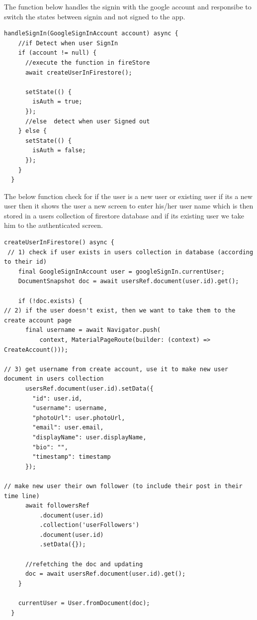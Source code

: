 The function below handles the signin with the google account and responsibe to switch the states between signin and not signed to the app.
\begin{verbatim}
handleSignIn(GoogleSignInAccount account) async {
    //if Detect when user SignIn
    if (account != null) {
      //execute the function in fireStore
      await createUserInFirestore();

      setState(() {
        isAuth = true;
      });
      //else  detect when user Signed out
    } else {
      setState(() {
        isAuth = false;
      });
    }
  }

\end{verbatim}

The below function check for if the user is a new user or existing user if its a new user then it shows the user a new screen to enter his/her user name which is then stored in a users collection of firestore database and if its existing user we take him to the authenticated screen.

\begin{verbatim}
createUserInFirestore() async {
 // 1) check if user exists in users collection in database (according to their id)
    final GoogleSignInAccount user = googleSignIn.currentUser;
    DocumentSnapshot doc = await usersRef.document(user.id).get();

    if (!doc.exists) {
// 2) if the user doesn't exist, then we want to take them to the create account page
      final username = await Navigator.push(
          context, MaterialPageRoute(builder: (context) => CreateAccount()));

// 3) get username from create account, use it to make new user document in users collection
      usersRef.document(user.id).setData({
        "id": user.id,
        "username": username,
        "photoUrl": user.photoUrl,
        "email": user.email,
        "displayName": user.displayName,
        "bio": "",
        "timestamp": timestamp
      });

// make new user their own follower (to include their post in their time line)
      await followersRef
          .document(user.id)
          .collection('userFollowers')
          .document(user.id)
          .setData({});

      //refetching the doc and updating
      doc = await usersRef.document(user.id).get();
    }

    currentUser = User.fromDocument(doc);
  }

\end{verbatim}
